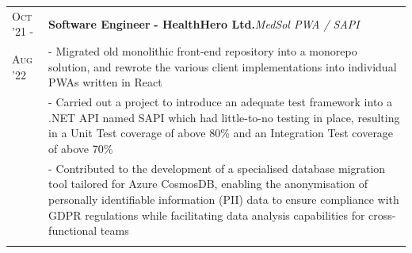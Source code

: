 \documentclass[a4paper,10pt]{extarticle} %
\begin{document}
{\begin{tabularx}{\linewidth}{ l | X }
\textsc{Oct '21 -} & \textbf{Software Engineer} \textbf{ - HealthHero Ltd.}\hfill\textit{MedSol PWA / SAPI}\\
\textsc{Aug '22}& {- Migrated old monolithic front-end repository into a monorepo solution, and rewrote the various client implementations into individual PWAs written in React}\\
& {- Carried out a project to introduce an adequate test framework into a .NET API named SAPI which had little-to-no testing in place, resulting in a Unit Test coverage of above 80\% and an Integration Test coverage of above 70\%}\\
& {- Contributed to the development of a specialised database migration tool tailored for Azure CosmosDB, enabling the anonymisation of personally identifiable information (PII) data to ensure compliance with GDPR regulations while facilitating data analysis capabilities for cross-functional teams}\\
\multicolumn{1}{c}{} \\



\end{tabularx}}
\end{document}
